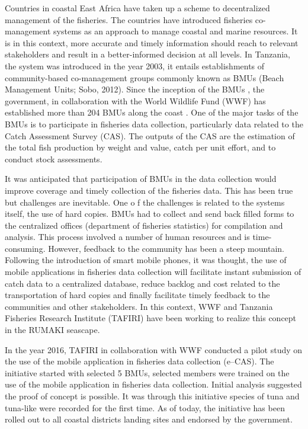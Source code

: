 \documentclass[
  12pt,
  a4paper,
  oneside]{book}
\begin{document}
Countries in coastal East Africa have taken up a scheme to decentralized management of the fisheries. The countries have introduced fisheries co-management systems as an approach to manage coastal and marine resources. It is in this context, more accurate and timely information should reach to relevant stakeholders and result in a better-informed decision at all levels. In Tanzania, the system was introduced in the year 2003, it entails establishments of community-based co-management groups commonly known as BMUs (Beach Management Units; Sobo, 2012). Since the inception of the BMUs , the government, in collaboration with the World Wildlife Fund (WWF)  has established more than 204 BMUs along the coast \citep{kanyange}. One of the major tasks of the BMUs is to participate in fisheries data collection, particularly data related to the Catch Assessment Survey (CAS). The outputs of the CAS are the estimation of the total fish production by weight and value, catch per unit effort, and to conduct stock assessments.

It was anticipated that participation of BMUs in the data collection would improve coverage and timely collection of the fisheries data. This has been true but challenges are inevitable. One o f the challenges is related to the systems itself, the use of hard copies. BMUs had to collect and send back filled forms to the centralized offices (department of fisheries statistics) for compilation and analysis. This process involved a number of human resources and is time-consuming. However, feedback to the community has been a steep mountain. Following the introduction of smart mobile phones, it was thought, the use of mobile applications in fisheries data collection will facilitate instant submission of catch data to a centralized database, reduce backlog and cost related to the transportation of hard copies and finally facilitate timely feedback to the communities and other stakeholders. In this context, WWF and Tanzania Fisheries Research Institute (TAFIRI) have been working to realize this concept in the RUMAKI seascape.

In the year 2016, TAFIRI  in collaboration with WWF conducted a pilot study on the use of the mobile application in fisheries data collection (e--CAS). The initiative started with selected 5 BMUs, selected members were trained on the use of the mobile application in fisheries data collection. Initial analysis suggested the proof of concept is possible. It was through this initiative species of tuna and tuna-like were recorded for the first time. As of today, the initiative has been rolled out to all coastal districts landing sites and endorsed by the government.
\end{document}
